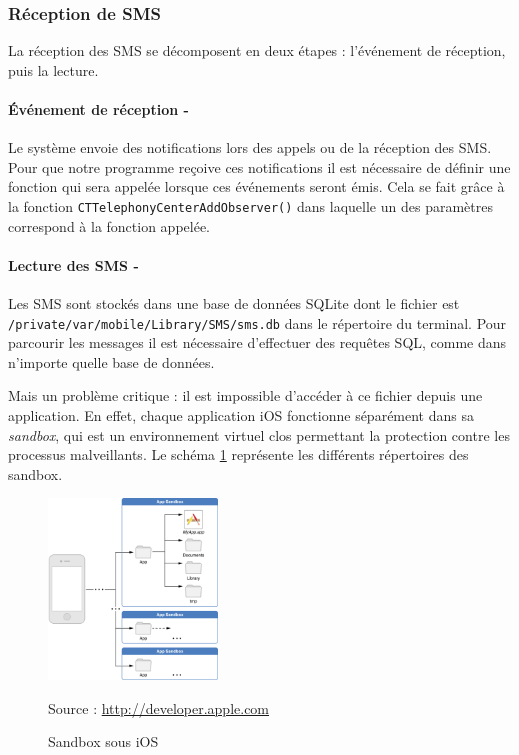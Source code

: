 \subsubsection{Réception de SMS}
\label{III_iOS_receptionSMS}

La réception des SMS se décomposent en deux étapes : l'événement de réception, puis la lecture.

\paragraph{Événement de réception -}
Le système envoie des notifications lors des appels ou de la réception des SMS.
Pour que notre programme reçoive ces notifications il est nécessaire de définir une fonction qui sera appelée lorsque ces événements seront émis.
Cela se fait grâce à la fonction \lstinline{CTTelephonyCenterAddObserver()} dans laquelle un des paramètres correspond à la fonction appelée.



\paragraph{Lecture des SMS -}
Les SMS sont stockés dans une base de données SQLite dont le fichier est \lstinline{/private/var/mobile/Library/SMS/sms.db} dans le répertoire du terminal.
Pour parcourir les messages il est nécessaire d'effectuer des requêtes SQL, comme dans n'importe quelle base de données.

Mais un problème critique : il est impossible d'accéder à ce fichier depuis une application.
En effet, chaque application iOS fonctionne séparément dans sa \textit{sandbox}, qui est un environnement virtuel clos permettant la protection contre les processus malveillants.
Le schéma \ref{iOS_sandbox} représente les différents répertoires des sandbox.
\begin{figure}[!h]
	\center
	\includegraphics[width=0.4\textwidth]{img/iOS_sandbox.png}
	\caption{Sandbox sous iOS}
	Source : \href{http://developer.apple.com/library/ios/#documentation/iphone/conceptual/iphoneosprogrammingguide/TheiOSEnvironment/TheiOSEnvironment.html}{http://developer.apple.com}
	\label{iOS_sandbox}
\end{figure}


